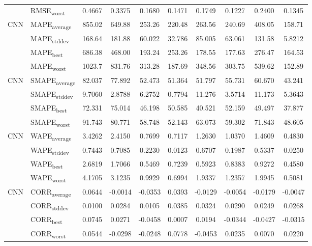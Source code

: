 {\begin{longtable}{l l c c c c c c c c}
 & RMSE\textsubscript{worst} & 0.4667 & 0.3375 & 0.1680 & 0.1471 & 0.1749 & 0.1227 & 0.2400 & 0.1345 \\
\cmidrule(lr){2-10}
\multirow{4}{*}{CNN} & MAPE\textsubscript{average} & 855.02 & 649.88 & 253.26 & 220.48 & 263.56 & 240.69 & 408.05 & 158.71 \\
 & MAPE\textsubscript{stddev} & 168.64 & 181.88 & 60.022 & 32.786 & 85.005 & 63.061 & 131.58 & 5.8212 \\
 & MAPE\textsubscript{best} & 686.38 & 468.00 & 193.24 & 253.26 & 178.55 & 177.63 & 276.47 & 164.53 \\
 & MAPE\textsubscript{worst} & 1023.7 & 831.76 & 313.28 & 187.69 & 348.56 & 303.75 & 539.62 & 152.89 \\
\cmidrule(lr){2-10}
\multirow{4}{*}{CNN} & SMAPE\textsubscript{average} & 82.037 & 77.892 & 52.473 & 51.364 & 51.797 & 55.731 & 60.670 & 43.241 \\
 & SMAPE\textsubscript{stddev} & 9.7060 & 2.8788 & 6.2752 & 0.7794 & 11.276 & 3.5714 & 11.173 & 5.3643 \\
 & SMAPE\textsubscript{best} & 72.331 & 75.014 & 46.198 & 50.585 & 40.521 & 52.159 & 49.497 & 37.877 \\
 & SMAPE\textsubscript{worst} & 91.743 & 80.771 & 58.748 & 52.143 & 63.073 & 59.302 & 71.843 & 48.605 \\
\cmidrule(lr){2-10}
\multirow{4}{*}{CNN} & WAPE\textsubscript{average} & 3.4262 & 2.4150 & 0.7699 & 0.7117 & 1.2630 & 1.0370 & 1.4609 & 0.4830 \\
 & WAPE\textsubscript{stddev} & 0.7443 & 0.7085 & 0.2230 & 0.0123 & 0.6707 & 0.1987 & 0.5337 & 0.0250 \\
 & WAPE\textsubscript{best} & 2.6819 & 1.7066 & 0.5469 & 0.7239 & 0.5923 & 0.8383 & 0.9272 & 0.4580 \\
 & WAPE\textsubscript{worst} & 4.1705 & 3.1235 & 0.9929 & 0.6994 & 1.9337 & 1.2357 & 1.9945 & 0.5081 \\
\cmidrule(lr){2-10}
\multirow{4}{*}{CNN} & CORR\textsubscript{average} & 0.0644 & -0.0014 & -0.0353 & 0.0393 & -0.0129 & -0.0054 & -0.0179 & -0.0047 \\
 & CORR\textsubscript{stddev} & 0.0100 & 0.0284 & 0.0105 & 0.0385 & 0.0324 & 0.0290 & 0.0249 & 0.0268 \\
 & CORR\textsubscript{best} & 0.0745 & 0.0271 & -0.0458 & 0.0007 & 0.0194 & -0.0344 & -0.0427 & -0.0315 \\
 & CORR\textsubscript{worst} & 0.0544 & -0.0298 & -0.0248 & 0.0778 & -0.0453 & 0.0235 & 0.0070 & 0.0220 \\

\end{longtable}}
